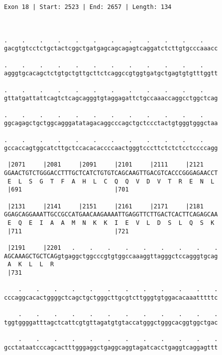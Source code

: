 \documentclass{article}
\begin{document}
\begin{Verbatim}
Exon 18 | Start: 2523 | End: 2657 | Length: 134



.    .    .    .    .    .    .    .    .    .    .    .    
gacgtgtcctctgctactcggctgatgagcagcagagtcaggatctcttgtgcccaaacc
                                                            
.    .    .    .    .    .    .    .    .    .    .    .    
agggtgcacagctctgtgctgttgcttctcaggccgtggtgatgctgagtgtgtttggtt
                                                            
.    .    .    .    .    .    .    .    .    .    .    .    
gttatgattattcagtctcagcagggtgtaggagattctgccaaaccaggcctggctcag
                                                            
.    .    .    .    .    .    .    .    .    .    .    .    
ggcagagctgctggcagggatatagacaggcccagctgctccctactgtgggtgggctaa
                                                            
.    .    .    .    .    .    .    .    .    .    .    .    
gccaccagtggcatcttgctccacacaccccaactgggtcccttctctctcctccccagg
                                                            
 |2071     |2081     |2091     |2101     |2111     |2121    
GGAACTGTCTGGGACCTTTGCTCATCTGTGTCAGCAAGTTGACGTCACCCGGGAGAACCT
 E  L  S  G  T  F  A  H  L  C  Q  Q  V  D  V  T  R  E  N  L 
 |691                          |701                         
  
 |2131     |2141     |2151     |2161     |2171     |2181    
GGAGCAGGAAATTGCCGCCATGAACAAGAAAATTGAGGTTCTTGACTCACTTCAGAGCAA
 E  Q  E  I  A  A  M  N  K  K  I  E  V  L  D  S  L  Q  S  K 
 |711                          |721                         
  
 |2191     |2201   .    .    .    .    .    .    .    .    .
AGCAAAGCTGCTCAGgtgaggctggcccgtgtggccaaaggttagggctccagggtgcag
 A  K  L  L  R                                              
 |731                                                       
  
    .    .    .    .    .    .    .    .    .    .    .    .
cccaggcacactggggctcagctgctgggcttgcgtcttgggtgtggacacaaatttttc
                                                            
    .    .    .    .    .    .    .    .    .    .    .    .
tggtggggatttagctcattcgtgttagatgtgtaccatgggctgggcacggtggctgac
                                                            
    .    .    .    .    .    .    .    .    .    .    .    .
gcctataatcccagcactttgggaggctgaggcaggtagatcacctgaggtcaggagttt
                                                            

\end{Verbatim}
\end{document}
